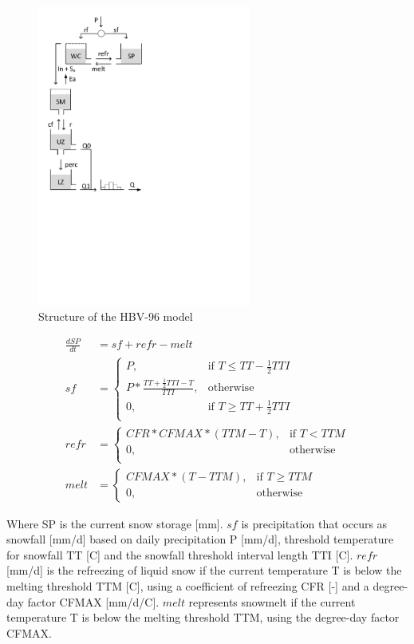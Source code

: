 { 																	%
\begin{figure}
\includegraphics[trim=1cm 11.1cm 7cm 1cm,width=7cm,keepaspectratio]{./AppA_files/37_schematic.pdf}
\caption{Structure of the HBV-96 model} \label{fig:37_schematic}
\end{figure}

\begin{align}
	\frac{dSP}{dt} &= sf+refr-melt \\
	sf &= \begin{cases}
		P, &\text{if } T \leq TT-\frac{1}{2}TTI \\
		P*\frac{ TT+\frac{1}{2}TTI-T}{TTI}, &\text{otherwise}\\
		0, &\text{if } T \geq TT+\frac{1}{2}TTI \\
	\end{cases} \\
	refr &= 
	\begin{cases}
		CFR*CFMAX*(TTM-T), & \text{if } T < TTM \\
		0, & \text{otherwise}\\
	\end{cases}\\
	melt &= \begin{cases}
		CFMAX*(T-TTM), &\text{if } T \geq TTM\\
		0, &\text{otherwise}
	\end{cases}
\end{align}

Where SP is the current snow storage [mm]. $sf$ is precipitation that occurs as snowfall [mm/d] based on daily precipitation P [mm/d], threshold temperature for snowfall TT [\degree C] and the snowfall threshold interval length TTI [\degree C]. $refr$ [mm/d] is the refreezing of liquid snow if the current temperature T is below the melting threshold TTM [\degree C], using a coefficient of refreezing CFR [-] and a degree-day factor CFMAX [mm/d/\degree C]. $melt$ represents snowmelt if the current temperature T is below the melting threshold TTM, using the degree-day factor CFMAX. 

} %


